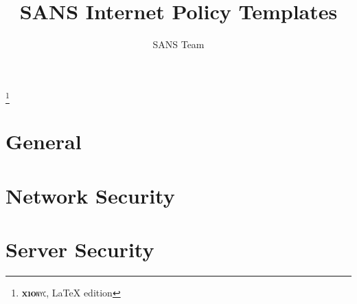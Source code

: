 \documentclass[letterpaper,12pt]{report}
\begin{document}
\newcommand{\xio}{\textsf{\textbf{x\i{}o}\texttt{\textsc{nyc}}}}
\author{SANS Team}
\thanks{\xio{}, \LaTeX{} edition}
\title{SANS Internet Policy Templates}
\date{}

\maketitle
\tableofcontents
\part{General}
\part{Network Security}
\part{Server Security}
\end{document}
